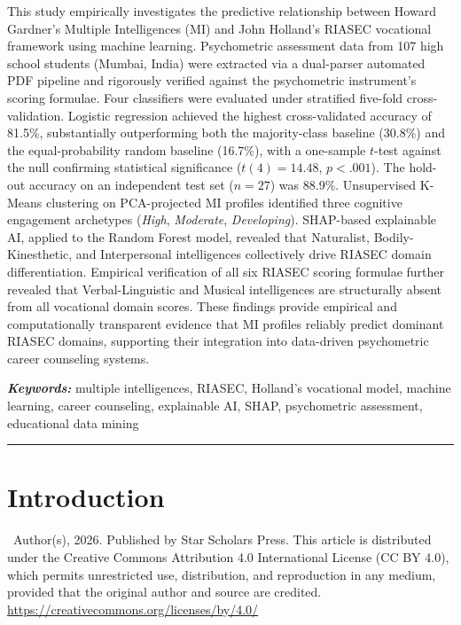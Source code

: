 \documentclass[12pt, a4paper]{article}
\begin{document}
\begin{singlespacing}
\noindent This study empirically investigates the predictive relationship between Howard Gardner's Multiple Intelligences (MI) and John Holland's RIASEC vocational framework using machine learning. Psychometric assessment data from 107 high school students (Mumbai, India) were extracted via a dual-parser automated PDF pipeline and rigorously verified against the psychometric instrument's scoring formulae. Four classifiers were evaluated under stratified five-fold cross-validation. Logistic regression achieved the highest cross-validated accuracy of 81.5\%, substantially outperforming both the majority-class baseline (30.8\%) and the equal-probability random baseline (16.7\%), with a one-sample $t$-test against the null confirming statistical significance ($t(4) = 14.48$, $p < .001$). The hold-out accuracy on an independent test set ($n = 27$) was 88.9\%. Unsupervised K-Means clustering on PCA-projected MI profiles identified three cognitive engagement archetypes (\textit{High}, \textit{Moderate}, \textit{Developing}). SHAP-based explainable AI, applied to the Random Forest model, revealed that Naturalist, Bodily-Kinesthetic, and Interpersonal intelligences collectively drive RIASEC domain differentiation. Empirical verification of all six RIASEC scoring formulae further revealed that Verbal-Linguistic and Musical intelligences are structurally absent from all vocational domain scores. These findings provide empirical and computationally transparent evidence that MI profiles reliably predict dominant RIASEC domains, supporting their integration into data-driven psychometric career counseling systems.
\end{singlespacing}

\vspace{0.4em}
\noindent\textit{\textbf{Keywords:}} multiple intelligences, RIASEC, Holland's vocational model, machine learning, career counseling, explainable AI, SHAP, psychometric assessment, educational data mining
\vspace{0.2em}
\noindent\rule{\textwidth}{0.4pt}

\vspace{0.5cm}

\section{Introduction}
\pagestyle{secondpage}

{\footnotesize\singlespacing\noindent
\textcopyright~Author(s), 2026. Published by Star Scholars Press. This article is distributed under the Creative Commons Attribution 4.0 International License (CC BY 4.0), which permits unrestricted use, distribution, and reproduction in any medium, provided that the original author and source are credited. \url{https://creativecommons.org/licenses/by/4.0/}}
\end{document}
